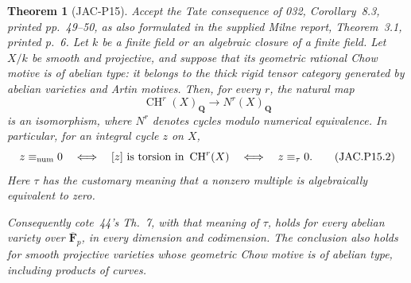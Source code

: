 \documentclass[11pt,a4paper]{article}
\newtheorem{theorem}{Theorem}[section]
\begin{document}
\begin{theorem}[JAC-P15]\label{jac:P15}
Accept the Tate consequence of 032, Corollary~8.3, printed
pp.~49--50, as also formulated in the supplied Milne report,
Theorem~3.1, printed p.~6. Let $k$ be a finite field
or an algebraic closure of a finite field. Let $X/k$ be smooth and
projective, and suppose that its geometric rational Chow motive is
of abelian type: it belongs to the thick rigid tensor category
generated by abelian varieties and Artin motives.
Then, for every $r$, the natural map
\[
 \operatorname{CH}^r(X)_{\mathbf Q}
        \longrightarrow N^r(X)_{\mathbf Q}                 \tag{JAC.P15.1}
\]
is an isomorphism, where $N^r$ denotes cycles modulo numerical
equivalence. In particular, for an integral cycle $z$ on $X$,
\[
 z\equiv_{\rm num}0
 \quad\Longleftrightarrow\quad
 [z]\text{ is torsion in }\operatorname{CH}^r(X)
 \quad\Longleftrightarrow\quad
 z\equiv_\tau0.                                           \tag{JAC.P15.2}
\]
Here $\tau$ has the customary meaning that a nonzero multiple is
algebraically equivalent to zero.

Consequently cote~44's Th.~7, with that meaning of $\tau$, holds
for every abelian variety over $\overline{\mathbf F}_p$, in every
dimension and codimension. The conclusion also holds for smooth
projective varieties whose geometric Chow motive is of abelian
type, including products of curves.
\end{theorem}
\end{document}

